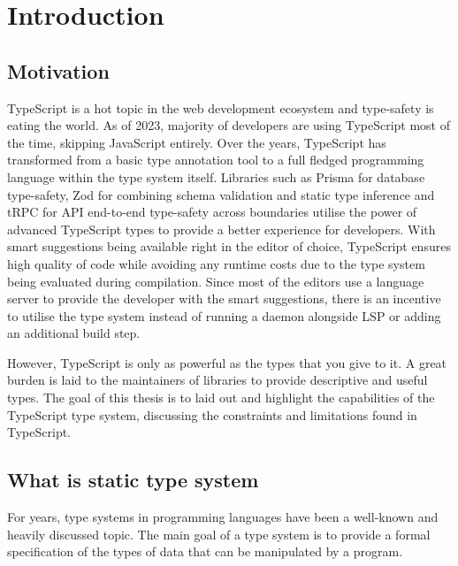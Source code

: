 \chapter{Introduction}

\section{Motivation}

TypeScript is a hot topic in the web development ecosystem and type-safety is eating the world. As of 2023, majority of developers are using TypeScript most of the time, skipping JavaScript entirely. Over the years, TypeScript has transformed from a basic type annotation tool to a full fledged programming language within the type system itself. Libraries such as Prisma for database type-safety, Zod for combining schema validation and static type inference and tRPC for API end-to-end type-safety across boundaries utilise the power of advanced TypeScript types to provide a better experience for developers. With smart suggestions being available right in the editor of choice, TypeScript ensures high quality of code while avoiding any runtime costs due to the type system being evaluated during compilation. Since most of the editors use a language server to provide the developer with the smart suggestions, there is an incentive to utilise the type system instead of running a daemon alongside LSP or adding an additional build step.

However, TypeScript is only as powerful as the types that you give to it. A great burden is laid to the maintainers of libraries to provide descriptive and useful types. The goal of this thesis is to laid out and highlight the capabilities of the TypeScript type system, discussing the constraints and limitations found in TypeScript. 

\section{What is static type system}

For years, type systems in programming languages have been a well-known and heavily discussed topic. The main goal of a type system is to provide a formal specification of the types of data that can be manipulated by a program.

